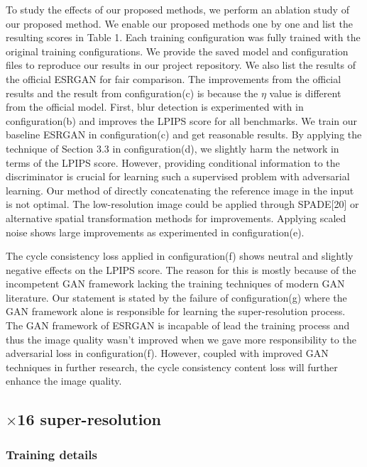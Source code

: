 \documentclass{article}
\begin{document}
To study the effects of our proposed methods, we perform an ablation study of our proposed method. We enable our proposed methods one by one and list the resulting scores in Table 1. Each training configuration was fully trained with the original training configurations. We provide the saved model and configuration files to reproduce our results in our project repository. We also list the results of the official ESRGAN for fair comparison. The improvements from the official results and the result from configuration(c) is because the $\eta$ value is different from the official model. First, blur detection is experimented with in configuration(b) and improves the LPIPS score for all benchmarks. We train our baseline ESRGAN in configuration(c) and get reasonable results. By applying the technique of Section 3.3 in configuration(d), we slightly harm the network in terms of the LPIPS score. However, providing conditional information to the discriminator is crucial for learning such a supervised problem with adversarial learning. Our method of directly concatenating the reference image in the input is not optimal. The low-resolution image could be applied through SPADE[20] or alternative spatial transformation methods for improvements. Applying scaled noise shows large improvements as experimented in configuration(e).

The cycle consistency loss applied in configuration(f) shows neutral and slightly negative effects on the LPIPS score. The reason for this is mostly because of the incompetent GAN framework lacking the training techniques of modern GAN literature. Our statement is stated by the failure of configuration(g) where the GAN framework alone is responsible for learning the super-resolution process. The GAN framework of ESRGAN is incapable of lead the training process and thus the image quality wasn't improved when we gave more responsibility to the adversarial loss in configuration(f). However, coupled with improved GAN techniques in further research, the cycle consistency content loss will further enhance the image quality.

\subsection{$\times$16 super-resolution}

\subsubsection{Training details}
\end{document}
